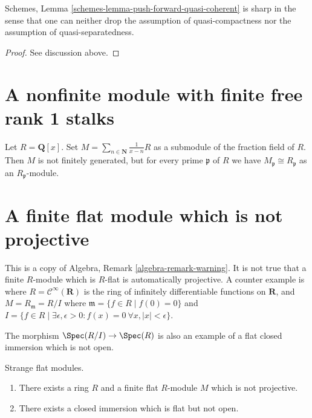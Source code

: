 \begin{lemma}
\label{lemma-pushforward-quasi-coherent}
Schemes, Lemma \ref{schemes-lemma-push-forward-quasi-coherent}
is sharp in the sense that one can neither drop the assumption
of quasi-compactness nor the assumption of quasi-separatedness.
\end{lemma}

\begin{proof}
See discussion above.
\end{proof}








\section{A nonfinite module with finite free rank 1 stalks}
\label{section-nonfree}

\noindent
Let $R = \mathbf{Q}[x]$. Set
$M = \sum_{n \in \mathbf{N}} \frac{1}{x - n}R$ as a submodule of
the fraction field of $R$. Then $M$ is not finitely generated, but
for every prime $\mathfrak p$ of $R$ we have
$M_{\mathfrak p} \cong R_{\mathfrak p}$ as an
$R_{\mathfrak p}$-module.




\section{A finite flat module which is not projective}
\label{section-finite-flat-not-projective}

\noindent
This is a copy of
Algebra, Remark \ref{algebra-remark-warning}.
It is not true that a finite $R$-module which is
$R$-flat is automatically projective. A counter
example is where $R = \mathcal{C}^\infty(\mathbf{R})$
is the ring of infinitely differentiable functions on
$\mathbf{R}$, and $M = R_{\mathfrak m} = R/I$ where
$\mathfrak m = \{f \in R \mid f(0) = 0\}$ and
$I = \{f \in R \mid \exists \epsilon, \epsilon > 0 :
f(x) = 0\ \forall x, |x| < \epsilon\}$.

\medskip\noindent
The morphism $\Spec(R/I) \to \Spec(R)$ is also
an example of a flat closed immersion which is not open.

\begin{lemma}
\label{lemma-finite-flat-non-projective}
Strange flat modules.
\begin{enumerate}
\item There exists a ring $R$ and a finite flat $R$-module $M$ which is
not projective.
\item There exists a closed immersion which is flat but not open.
\end{enumerate}
\end{lemma}

